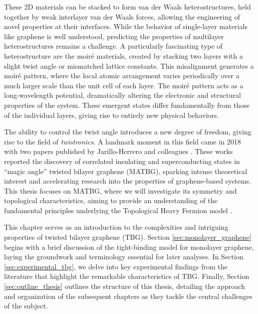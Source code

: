 These 2D materials can be stacked to form van der Waals heterostructures, held together by weak interlayer van der Waals forces, allowing the engineering of novel properties at their interfaces. While the behavior of single-layer materials like graphene is well understood, predicting the properties of multilayer heterostructures remains a challenge. A particularly fascinating type of heterostructure are the moiré materials, created by stacking two layers with a slight twist angle or mismatched lattice constants. This misalignment generates a moiré pattern, where the local atomic arrangement varies periodically over a much larger scale than the unit cell of each layer. The moiré pattern acts as a long-wavelength potential, dramatically altering the electronic and structural properties of the system. These emergent states differ fundamentally from those of the individual layers, giving rise to entirely new physical behaviors.

The ability to control the twist angle introduces a new degree of freedom, giving rise to the field of \textit{twistronics}. A landmark moment in this field came in 2018 with two papers published by Jarillo-Herrero and colleagues \cite{cao2018, cao2018_correlated}. These works reported the discovery of correlated insulating and superconducting states in ``magic angle'' twisted bilayer graphene (MATBG), sparking intense theoretical interest and accelerating research into the properties of graphene-based systems.
This thesis focuses on MATBG, where we will investigate its symmetry and topological characteristics, aiming to provide an understanding of the fundamental principles underlying the Topological Heavy Fermion model \cite{topoheavyfermion2022}.

\pagebreak

This chapter serves as an introduction to the complexities and intriguing properties of twisted bilayer graphene (TBG). Section \ref{sec:monolayer_graphene} begins with a brief discussion of the tight-binding model for monolayer graphene, laying the groundwork and terminology essential for later analyses. In Section \ref{sec:experimental_tbg}, we delve into key experimental findings from the literature that highlight the remarkable characteristics of TBG. Finally, Section \ref{sec:outline_thesis} outlines the structure of this thesis, detailing the approach and organization of the subsequent chapters as they tackle the central challenges of the subject.

